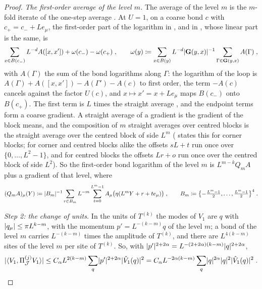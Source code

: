 \documentclass[11pt]{preprint}
\DeclarePairedDelimiter{\abs}{\lvert}{\rvert}
\numberwithin{equation}{section}
\theoremstyle{definition}
\theoremstyle{remark}
\theoremstyle{plain}
\begin{document}
\begin{proof}
\emph{The first-order average of the level $m$.} The average of the level $m$ is the $m$-fold iterate of the one-step average \cite[(0.17), (0.19), p.~255]{BalabanRG1}. At $U = 1$, on a coarse bond $c$ with $c_+ = c_- + Le_\mu$, the first-order part of the logarithm in \cite[(0.4), p.~253]{BalabanRG1}, and in \cite[(0.12), p.~254]{BalabanRG1}, whose linear part is the same, is
\begin{equation}\label{eq:one-step-linear}
    \sum_{x \in B(c_-)}L^{-d}A([x, x']) + \omega(c_-) - \omega(c_+)\;,
    \qquad
    \omega(y) \coloneqq \sum_{x \in B(y)}L^{-d}\abs{\mathbf G(y, x)}^{-1}\sum_{\Gamma \in \mathbf G(y, x)}A(\Gamma)\;,
\end{equation}
with $A(\Gamma)$ the sum of the bond logarithms along $\Gamma$: the logarithm of the loop is $A(\Gamma) + A([x, x']) - A(\Gamma') - A(c)$ to first order, the term $-A(c)$ cancels against the factor $U(c)$, and $x \mapsto x' = x + Le_\mu$ maps $B(c_-)$ onto $B(c_+)$. The first term is $L$ times the straight average \cite[(1.11), p.~19]{BalabanPRT1}, and the endpoint terms form a coarse gradient. A straight average of a gradient is the gradient of the block means, and the composition of $m$ straight averages over centred blocks is the straight average over the centred block of side $L^m$ (\cite[(1.16)--(1.18), p.~20]{BalabanPRT1} states this for corner blocks; for corner and centred blocks alike the offsets $sL + t$ run once over $\{ 0, \dots, L^2 - 1 \}$, and for centred blocks the offsets $Lr + o$ run once over the centred block of side $L^2$). So the first-order bond logarithm of the level $m$ is $L^{m-k}Q_mA$ plus a gradient of that level, where
\begin{equation}\label{eq:straight-average}
    (Q_mA)_\mu(Y) \coloneqq \abs{B_m}^{-1}\sum_{r \in B_m}L^{-m}\sum_{t=0}^{L^m-1}A_\mu\bigl(\eta(L^mY + r + te_\mu)\bigr)\;,
    \qquad
    B_m \coloneqq \bigl\{ -\tfrac{L^m-1}{2}, \dots, \tfrac{L^m-1}{2} \bigr\}^4\;.
\end{equation}

\emph{Step 2: the change of units.} In the units of $T^{(k)}$ the modes of $V_1$ are $q$ with $\abs{q_\mu} \leq \pi L^{k-m}$, with the momentum $p' = L^{-(k-m)}q$ of the level $m$; a bond of the level $m$ carries $L^{-(k-m)}$ times the amplitude of $T^{(k)}$, and there are $L^{4(k-m)}$ sites of the level $m$ per site of $T^{(k)}$. So, with $\abs{p'}^{2+2\alpha} = L^{-(2+2\alpha)(k-m)}\abs{q}^{2+2\alpha}$,
\begin{equation}\label{eq:current-units}
    \abs{\langle V_1, \Pi^{(j)}_{\mathcal J}V_1 \rangle} \leq C_\alpha L^{2(k-m)}\sum_q\abs{p'}^{2+2\alpha}\abs{\hat V_1(q)}^2 = C_\alpha L^{-2\alpha(k-m)}\sum_q\abs{q}^{2\alpha}\abs{q}^2\abs{\hat V_1(q)}^2\;.
\end{equation}


\end{proof}
\end{document}
